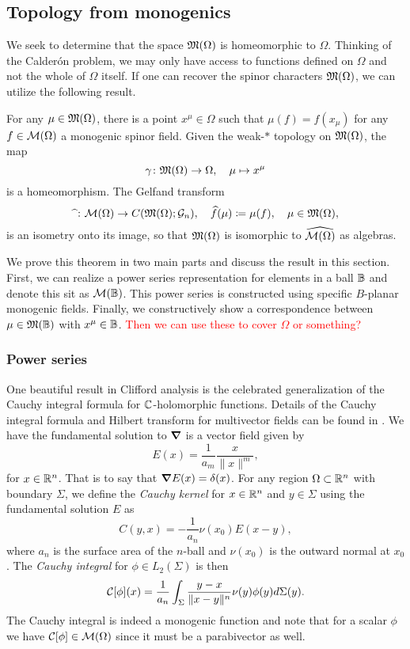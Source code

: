 \subsection{Topology from monogenics}

We seek to determine that the space $\mathfrak{M}(\Omega)$ is homeomorphic to $\Omega$.  Thinking of the Calder\'on problem, we may only have access to functions defined on $\Omega$ and not the whole of $\Omega$ itself.  If one can recover the spinor characters $\mathfrak{M}(\Omega)$, we can utilize the following result.

\begin{theorem}
For any $\mu \in \mathfrak{M}(\Omega)$, there is a point $x^\mu \in \Omega$ such that $\mu(f) = f(x_\mu)$ for any $f\in \mathcal{M}(\Omega)$ a monogenic spinor field. Given the weak-$\ast$ topology on $\mathfrak{M}(\Omega)$, the map
\[
\gamma \colon \mathfrak{M}(\Omega) \to \Omega, \quad \mu \mapsto x^\mu
\]
is a homeomorphism. The Gelfand transform 
\[
\widehat{~} \colon \mathcal{M}(\Omega) \to C(\mathfrak{M}(\Omega); \mathcal{G}_n), \quad \widehat{f}(\mu) \coloneqq \mu(f), \quad \mu \in \mathfrak{M}(\Omega),
\]
is an isometry onto its image, so that $\mathfrak{M}(\Omega)$ is isomorphic to $\widehat{\mathcal{M}(\Omega)}$ as algebras.
\end{theorem}

We prove this theorem in two main parts and discuss the result in this section. First, we can realize a power series representation for elements in a ball $\mathbb{B}$ and denote this sit as $\mathcal{M}(\mathbb{B})$. This power series is constructed using specific $B$-planar monogenic fields. Finally, we constructively show a correspondence between $\mu \in \mathfrak{M}(\mathbb{B})$ with $x^\mu \in \mathbb{B}$. \textcolor{red}{Then we can use these to cover $\Omega$ or something?}

\subsubsection{Power series}


One beautiful result in Clifford analysis is the celebrated generalization of the Cauchy integral formula for $\mathbb{C}$-holomorphic functions. Details of the Cauchy integral formula and Hilbert transform for multivector fields can be found in \cite{brackx_hilbert_2008}. We have the fundamental solution to $\boldsymbol{\nabla}$ is a vector field given by
\[
E(x) = \frac{1}{a_m} \frac{x}{\|x\|^m},
\]
for $x\in \mathbb{R}^n$. That is to say that $\boldsymbol{\nabla} E(x) = \delta(x)$. For any region $\Omega \subset \mathbb{R}^n$ with boundary $\Sigma$, we define the \emph{Cauchy kernel} for $x\in \mathbb{R}^n$ and $y \in \Sigma$ using the fundamental solution $E$ as
\[
C(y, x) = -\frac{1}{a_n} \nu(x_0) E(x-y),
\]
where $a_n$ is the surface area of the $n$-ball and $\nu(x_0)$ is the outward normal at $x_0$. The \emph{Cauchy integral} for $\phi \in L_2(\Sigma)$ is then
\[
\mathcal{C}[\phi](x) = \frac{1}{a_n} \int_{\Sigma} \frac{y-x}{\|x-y\|^n} \nu(y) \phi(y) d\Sigma(y).
\]
The Cauchy integral is indeed a monogenic function and note that for a scalar $\phi$ we have $\mathcal{C}[\phi] \in \mathcal{M}(\Omega)$ since it must be a parabivector as well.

